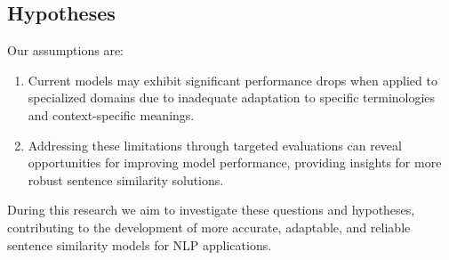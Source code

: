 \documentclass[11pt]{article}
\begin{document}
\subsection{Hypotheses}
Our assumptions are:
\begin{enumerate}
    \item Current models may exhibit significant performance drops when applied to specialized domains due to inadequate adaptation to specific terminologies and context-specific meanings.
    \item Addressing these limitations through targeted evaluations can reveal opportunities for improving model performance, providing insights for more robust sentence similarity solutions. 
\end{enumerate}

During this research we aim to investigate these questions and hypotheses, contributing to the development of more accurate, adaptable, and reliable sentence similarity models for NLP applications.

%
%
\end{document}
